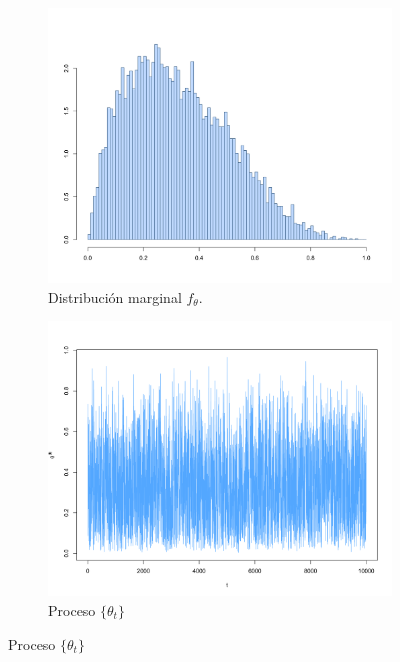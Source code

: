 \documentclass[11pt,a4paper]{article}
\begin{document}
\begin{figure}
    \vspace{0.2cm}
    
    \begin{subfigure}[t]{0.45\textwidth}
        \centering
        \includegraphics[width=\linewidth]{hier_hist_theta.png} 
        \caption{Distribución marginal $f_\theta$.} \label{fig:hier_hist_theta}
    \end{subfigure}
    \hfill
    \begin{subfigure}[t]{0.45\textwidth}
        \centering
        \includegraphics[width=\linewidth]{hier_chain_theta.png} 
        \caption{Proceso $\lbrace \theta_t \rbrace$} \label{fig:hier_chain_theta}
    \end{subfigure}
    

\end{figure}
\end{document}
